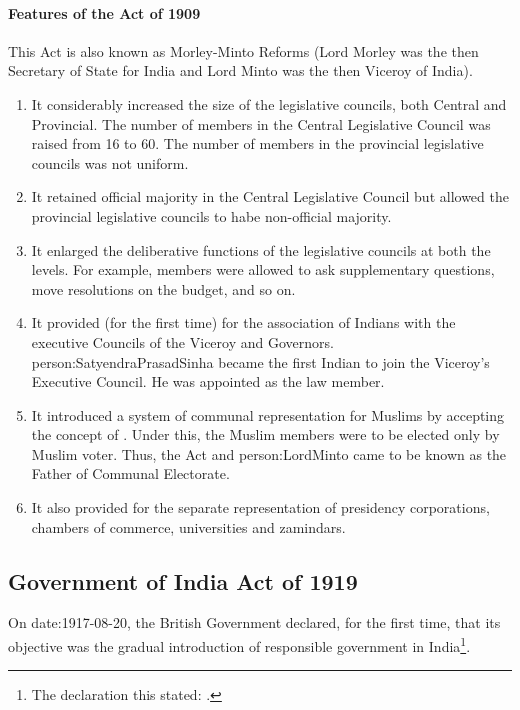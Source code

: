\paragraph{Features of the Act of 1909}
This Act is also known as Morley-Minto Reforms (Lord Morley was the then Secretary of State for India and Lord Minto was the then Viceroy of India).
\begin{enumerate}
  \item It considerably increased the size of the legislative councils, both Central and Provincial. The number of members in the Central Legislative Council was raised from 16 to 60. The number of members in the provincial legislative councils was not uniform.
  \item It retained official majority in the Central Legislative Council but allowed the provincial legislative councils to habe non-official majority.
  \item It enlarged the deliberative functions of the legislative councils at both the levels. For example, members were allowed to ask supplementary questions, move resolutions on the budget, and so on.
  \item It provided (for the first time) for the association of Indians with the executive Councils of the Viceroy and Governors. \gls{person:SatyendraPrasadSinha} became the first Indian to join the Viceroy's Executive Council. He was appointed as the law member.
  \item It introduced a system of communal representation for Muslims by accepting the concept of . Under this, the Muslim members were to be elected only by Muslim voter. Thus, the Act  and \gls{person:LordMinto} came to be known as the Father of Communal Electorate.
  \item It also provided for the separate representation of presidency corporations, chambers of commerce, universities and zamindars.
\end{enumerate}

\subsection{Government of India Act of 1919}

On \gls{date:1917-08-20}, the British Government declared, for the first time, that its objective was the gradual introduction of responsible government in India\footnote{The declaration this stated: .}.

